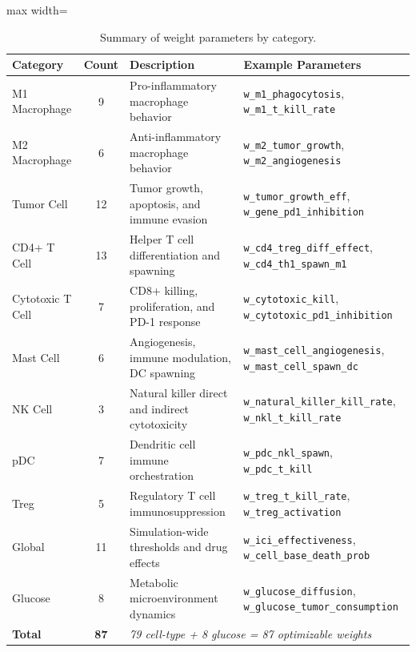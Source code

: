 \begin{table}[htbp]
\centering
\caption{Summary of weight parameters by category.}
\label{tab:param-summary}
\begin{adjustbox}{max width=\textwidth}
\begin{tabular}{@{}lclp{5.8cm}@{}}
\toprule
\textbf{Category} & \textbf{Count} & \textbf{Description} & \textbf{Example Parameters} \\
\midrule
M1 Macrophage & 9 & Pro-inflammatory macrophage behavior & \texttt{w\_m1\_phagocytosis}, \texttt{w\_m1\_t\_kill\_rate} \\
M2 Macrophage & 6 & Anti-inflammatory macrophage behavior & \texttt{w\_m2\_tumor\_growth}, \texttt{w\_m2\_angiogenesis} \\
Tumor Cell & 12 & Tumor growth, apoptosis, and immune evasion & \texttt{w\_tumor\_growth\_eff}, \texttt{w\_gene\_pd1\_inhibition} \\
CD4+ T Cell & 13 & Helper T cell differentiation and spawning & \texttt{w\_cd4\_treg\_diff\_effect}, \texttt{w\_cd4\_th1\_spawn\_m1} \\
Cytotoxic T Cell & 7 & CD8+ killing, proliferation, and PD-1 response & \texttt{w\_cytotoxic\_kill}, \texttt{w\_cytotoxic\_pd1\_inhibition} \\
Mast Cell & 6 & Angiogenesis, immune modulation, DC spawning & \texttt{w\_mast\_cell\_angiogenesis}, \texttt{w\_mast\_cell\_spawn\_dc} \\
NK Cell & 3 & Natural killer direct and indirect cytotoxicity & \texttt{w\_natural\_killer\_kill\_rate}, \texttt{w\_nkl\_t\_kill\_rate} \\
pDC & 7 & Dendritic cell immune orchestration & \texttt{w\_pdc\_nkl\_spawn}, \texttt{w\_pdc\_t\_kill} \\
Treg & 5 & Regulatory T cell immunosuppression & \texttt{w\_treg\_t\_kill\_rate}, \texttt{w\_treg\_activation} \\
Global & 11 & Simulation-wide thresholds and drug effects & \texttt{w\_ici\_effectiveness}, \texttt{w\_cell\_base\_death\_prob} \\
Glucose & 8 & Metabolic microenvironment dynamics & \texttt{w\_glucose\_diffusion}, \texttt{w\_glucose\_tumor\_consumption} \\
\midrule
\textbf{Total} & \textbf{87} & \multicolumn{2}{l}{\textit{79 cell-type + 8 glucose = 87 optimizable weights}} \\
\bottomrule
\end{tabular}
\end{adjustbox}
\end{table}

